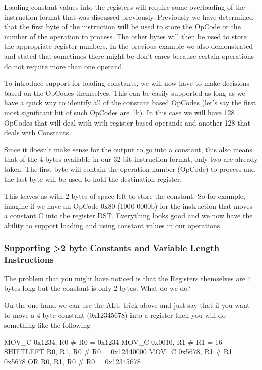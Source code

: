 Loading constant values into the registers will require some overloading of the instruction format that was discussed previously. Previously we have determined that the first byte of the instruction will be used to store the OpCode or the number of the operation to process. The other bytes will then be used to store the appropriate register numbers. In the previous example we also demonstrated and stated that sometimes there might be don't cares because certain operations do not require more than one operand. 

To introduce support for loading constants, we will now have to make decisions based on the OpCodes themselves. This can be easily supported as long as we have a quick way to identify all of the constant based OpCodes (let's say the first most significant bit of such OpCodes are 1b). In this case we will have 128 OpCodes that will deal with with register based operands and another 128 that deals with Constants. 

Since it doesn't make sense for the output to go into a constant, this also means that of the 4 bytes available in our 32-bit instruction format, only two are already taken. The first byte will contain the operation number (OpCode) to process and the last byte will be used to hold the destination register.

This leaves us with 2 bytes of space left to store the constant. So for example, imagine if we have an OpCode 0x80 (1000 0000b) for the  instruction that moves a constant C into the register DST. Everything looks good and we now have the ability to support loading and using constant values in our operations.

\subsubsection{Supporting >2 byte Constants and Variable Length Instructions}

The problem that you might have noticed is that the Registers themselves are 4 bytes long but the constant is only 2 bytes. What do we do? 

On the one hand we can use the ALU trick above and just say that if you want to move a 4 byte constant (0x12345678) into a register then you will do something like the following

\begin{code}
MOV_C 0x1234, R0 # R0 = 0x1234
MOV_C 0x0010, R1 # R1 = 16
SHIFTLEFT R0, R1, R0 # R0 = 0x12340000
MOV_C 0x5678, R1 # R1 = 0x5678
OR R0, R1, R0 # R0 = 0x12345678
\end{code}

